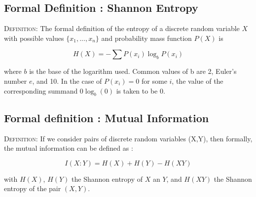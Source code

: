 \documentclass{article}
\begin{document}
\subsection{Formal Definition : Shannon Entropy}
\label{marker}
\vspace{2mm}
\begin{flushleft}
\vspace{2mm }
\begin{tcolorbox}
\textsc{Definition:}\cite{wiki-shannon}\newline\newline
The formal definition of the entropy of a discrete random variable $X$ with possible values $\{x_1, ... ,x_n\}$ and probability mass function $P(X)$ is
\vspace{4mm}
\begin{center}
\[
H(X) = - \sum{P(x_i)\log_b P(x_i)}
\]
\end{center}
\vspace{4mm}
where $b$ is the base of the logarithm used. Common values of b are 2, Euler's number $e$, and 10. In the case of $P(x_i) = 0$ for some $i$, the value of the corresponding summand $0\log_b (0)$ is taken to be 0.
\end{tcolorbox}
\end{flushleft}

\subsection{Formal definition : Mutual Information}
\label{marker2}
\vspace{2mm}
\begin{flushleft}
\vspace{2mm}
\begin{tcolorbox}
\textsc{Definition:}\cite{quantiki}\newline\newline
If we consider pairs of discrete random variables (X,Y), then formally, the mutual information can be defined as :
\begin{center}
\[
I(X : Y) = H(X) + H(Y) - H(XY)
\]
\end{center}
\vspace{2mm}
with $H(X)$, $H(Y)$ the Shannon entropy of $X$ an $Y$, and $H(XY)$ the Shannon entropy of the pair $(X, Y)$. 
\end{tcolorbox}
\end{flushleft}
\end{document}
